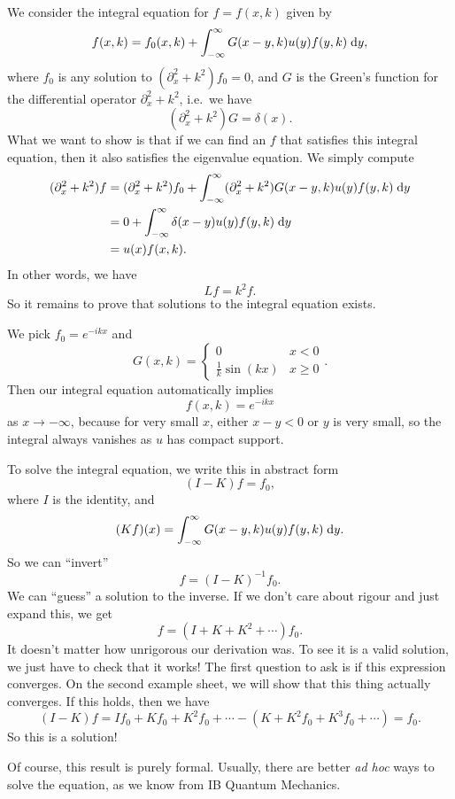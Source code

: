 \documentclass[a4paper]{article}
\begin{document}
We consider the integral equation for $f = f(x, k)$ given by
\[
  f(x, k) = f_0(x, k) + \int_{-\infty}^\infty G(x - y, k) u(y) f(y, k) \;\mathrm{d} y,
\]
where $f_0$ is any solution to $(\partial^2_x + k^2) f_0 = 0$, and $G$ is the Green's function for the differential operator $\partial^2_x + k^2$, i.e.\ we have
\[
  (\partial_x^2 + k^2) G = \delta(x).
\]
What we want to show is that if we can find an $f$ that satisfies this integral equation, then it also satisfies the eigenvalue equation. We simply compute
\begin{align*}
  (\partial_x^2 + k^2) f &= (\partial_x^2 + k^2)f_0 + \int_{-\infty}^\infty (\partial_x^2 + k^2) G(x - y, k) u(y) f(y, k) \;\mathrm{d} y\\\
  &= 0 + \int_{-\infty}^\infty \delta(x - y) u(y) f(y, k)\;\mathrm{d} y\\
  &= u(x) f(x, k).
\end{align*}
In other words, we have
\[
  Lf = k^2 f.
\]
So it remains to prove that solutions to the integral equation exists.

We pick $f_0 = e^{-ikx}$ and
\[
  G(x, k) =
  \begin{cases}
    0 & x < 0\\
    \frac{1}{k} \sin (kx) & x \geq 0
  \end{cases}.
\]
Then our integral equation automatically implies
\[
  f(x, k) = e^{-ikx}
\]
as $x \to -\infty$, because for very small $x$, either $x - y < 0$ or $y$ is very small, so the integral always vanishes as $u$ has compact support.

To solve the integral equation, we write this in abstract form
\[
  (I - K) f = f_0,
\]
where $I$ is the identity, and
\[
  (Kf)(x) = \int_{-\infty}^\infty G(x - y, k) u(y) f(y, k) \;\mathrm{d} y.
\]
So we can ``invert''
\[
  f = (I - K)^{-1} f_0.
\]
We can ``guess'' a solution to the inverse. If we don't care about rigour and just expand this, we get
\[
  f = (I + K + K^2 + \cdots)f_0.
\]
It doesn't matter how unrigorous our derivation was. To see it is a valid solution, we just have to check that it works! The first question to ask is if this expression converges. On the second example sheet, we will show that this thing actually converges. If this holds, then we have
\[
  (I - K)f = If_0 + K f_0 + K^2 f_0 + \cdots - (K + K^2 f_0 + K^3 f_0 + \cdots) = f_0.
\]
So this is a solution!

Of course, this result is purely formal. Usually, there are better \emph{ad hoc} ways to solve the equation, as we know from IB Quantum Mechanics.
\end{document}
